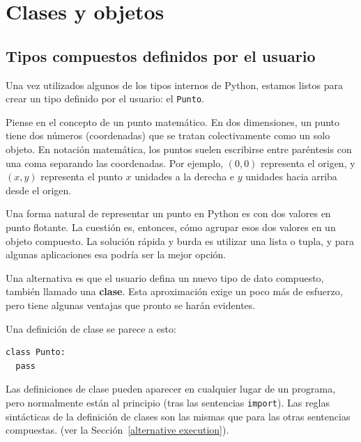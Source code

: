 
\chapter{Clases y objetos}

 

\section{Tipos compuestos definidos por el usuario}

\label{point}  
 

Una vez utilizados algunos de los tipos internos de Python, estamos
listos para crear un tipo definido por el usuario: el \texttt{Punto}.

Piense en el concepto de un punto matemático. En dos dimensiones,
un punto tiene dos números (coordenadas) que se tratan colectivamente
como un solo objeto. En notación matemática, los puntos suelen escribirse
entre paréntesis con una coma separando las coordenadas. Por ejemplo,
$(0,0)$ representa el origen, y $(x,y)$ representa el punto $x$
unidades a la derecha e $y$ unidades hacia arriba desde el origen.

Una forma natural de representar un punto en Python es con dos valores
en punto flotante. La cuestión es, entonces, cómo agrupar esos dos
valores en un objeto compuesto. La solución rápida y burda es utilizar
una lista o tupla, y para algunas aplicaciones esa podría ser la mejor
opción.


Una alternativa es que el usuario defina un nuevo tipo de dato compuesto,
también llamado una \textbf{clase}. Esta aproximación exige un poco
más de esfuerzo, pero tiene algunas ventajas que pronto se harán evidentes.

Una definición de clase se parece a esto:
\begin{lstlisting}
class Punto:
  pass
\end{lstlisting}
Las definiciones de clase pueden aparecer en cualquier lugar de un
programa, pero normalmente están al principio (tras las sentencias
\texttt{import}). Las reglas sintácticas de la definición de clases
son las mismas que para las otras sentencias compuestas. (ver la Sección~\ref{alternative execution}).

